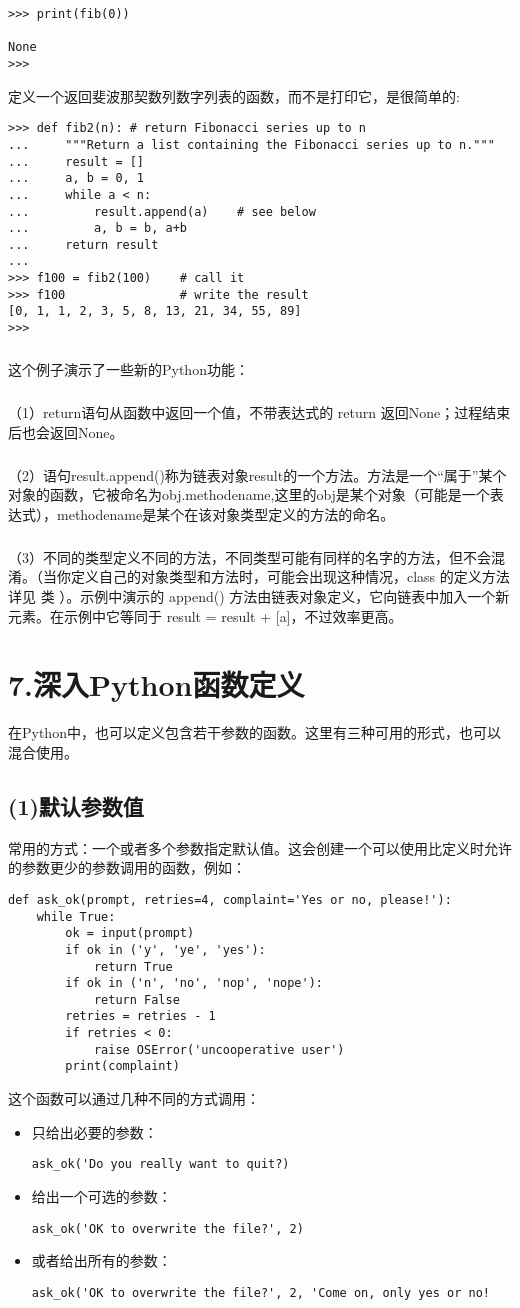 \documentclass{article}
\begin{document}
\begin{CJK}{UTF8}{gbsn}
\begin{verbatim}
>>> print(fib(0))

None
>>> 
\end{verbatim}
定义一个返回斐波那契数列数字列表的函数，而不是打印它，是很简单的:
\begin{verbatim}
>>> def fib2(n): # return Fibonacci series up to n
...     """Return a list containing the Fibonacci series up to n."""
...     result = []
...     a, b = 0, 1
...     while a < n:
...         result.append(a)    # see below
...         a, b = b, a+b
...     return result
...
>>> f100 = fib2(100)    # call it
>>> f100                # write the result
[0, 1, 1, 2, 3, 5, 8, 13, 21, 34, 55, 89]
>>> 
\end{verbatim}
\subparagraph*{}
这个例子演示了一些新的Python功能：
\subparagraph*{}
（1）return语句从函数中返回一个值，不带表达式的 return 返回None；过程结束后也会返回None。
\subparagraph*{}
（2）语句result.append()称为链表对象result的一个方法。方法是一个“属于”某个对象的函数，它被命名为obj.methodename,这里的obj是某个对象（可能是一个表达式），methodename是某个在该对象类型定义的方法的命名。
\subparagraph*{}
（3）不同的类型定义不同的方法，不同类型可能有同样的名字的方法，但不会混淆。（当你定义自己的对象类型和方法时，可能会出现这种情况，class 的定义方法详见 类 ）。示例中演示的 append() 方法由链表对象定义，它向链表中加入一个新元素。在示例中它等同于 result = result + [a]，不过效率更高。
\section*{7.深入Python函数定义}
在Python中，也可以定义包含若干参数的函数。这里有三种可用的形式，也可以混合使用。
\subsection*{(1)默认参数值}
常用的方式：一个或者多个参数指定默认值。这会创建一个可以使用比定义时允许的参数更少的参数调用的函数，例如：
\begin{verbatim}
def ask_ok(prompt, retries=4, complaint='Yes or no, please!'):
    while True:
        ok = input(prompt)
        if ok in ('y', 'ye', 'yes'):
            return True
        if ok in ('n', 'no', 'nop', 'nope'):
            return False
        retries = retries - 1
        if retries < 0:
            raise OSError('uncooperative user')
        print(complaint)
\end{verbatim}
这个函数可以通过几种不同的方式调用：
\begin{itemize}
    \item 只给出必要的参数：
\begin{verbatim}
ask_ok('Do you really want to quit?)
\end{verbatim}
    \item 给出一个可选的参数：
\begin{verbatim}
ask_ok('OK to overwrite the file?', 2)
\end{verbatim}
    \item 或者给出所有的参数：
\begin{verbatim}
ask_ok('OK to overwrite the file?', 2, 'Come on, only yes or no!
\end{verbatim}  
\end{itemize}

\end{CJK}
\end{document}
